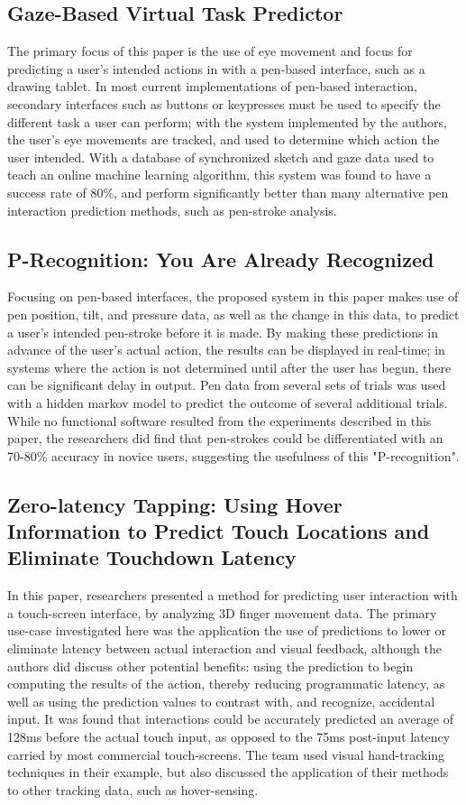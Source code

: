 \documentclass[format=acmsmall, nonacm, authorversion, screen]{acmart}
\begin{document}
\subsection{Gaze-Based Virtual Task Predictor \citep{cig2014gaze}}
The primary focus of this paper is the use of eye movement and focus for predicting a user's intended actions in with a pen-based interface, such as a drawing tablet. In most current implementations of pen-based interaction, secondary interfaces such as buttons or keypresses must be used to specify the different task a user can perform; with the system implemented by the authors, the user's eye movements are tracked, and used to determine which action the user intended. With a database of synchronized sketch and gaze data used to teach an online machine learning algorithm, this system was found to have a success rate of 80\%, and perform significantly better than many alternative pen interaction prediction methods, such as pen-stroke analysis. 

\subsection{P-Recognition: You Are Already Recognized \citep{manabe2009recognition}}
Focusing on pen-based interfaces, the proposed system in this paper makes use of pen position, tilt, and pressure data, as well as the change in this data, to predict a user's intended pen-stroke before it is made. By making these predictions in advance of the user's actual action, the results can be displayed in real-time; in systems where the action is not determined until after the user has begun, there can be significant delay in output. Pen data from several sets of trials was used with a hidden markov model to predict the outcome of several additional trials. While no functional software resulted from the experiments described in this paper, the researchers did find that pen-strokes could be differentiated with an 70-80\% accuracy in novice users, suggesting the usefulness of this "P-recognition". 

\subsection{Zero-latency Tapping: Using Hover Information to Predict Touch Locations and Eliminate Touchdown Latency \citep{xia2014zerolatency}}
In this paper, researchers presented a method for predicting user interaction with a touch-screen interface, by analyzing 3D finger movement data. The primary use-case investigated here was the application the use of predictions to lower or eliminate latency between actual interaction and visual feedback, although the authors did discuss other potential benefits: using the prediction to begin computing the results of the action, thereby reducing programmatic latency, as well as using the prediction values to contrast with, and recognize, accidental input. It was found that interactions could be accurately predicted an average of 128ms before the actual touch input, as opposed to the 75ms post-input latency carried by most commercial touch-screens. The team used visual hand-tracking techniques in their example, but also discussed the application of their methods to other tracking data, such as hover-sensing. 
\end{document}
